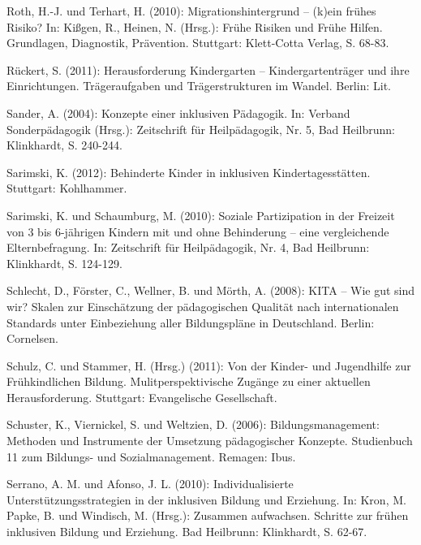 Roth, H.-J. und Terhart, H. (2010): Migrationshintergrund -- (k)ein frühes Risiko? In: Kißgen, R., Heinen, N. (Hrsg.): Frühe Risiken und Frühe Hilfen. Grundlagen, Diagnostik, Prävention. Stuttgart: Klett-Cotta Verlag, S. 68-83.

Rückert, S. (2011): Herausforderung Kindergarten -- Kindergartenträger und ihre Einrichtungen. Trägeraufgaben und Trägerstrukturen im Wandel. Berlin: Lit.
	
Sander, A. (2004): Konzepte einer inklusiven Pädagogik. In: Verband Sonderpädagogik (Hrsg.): Zeitschrift für Heilpädagogik, Nr. 5, Bad Heilbrunn: Klinkhardt, S. 240-244.


Sarimski, K. (2012): Behinderte Kinder in inklusiven Kindertagesstätten. Stuttgart: Kohlhammer. 

Sarimski, K. und Schaumburg, M. (2010): Soziale Partizipation in der Freizeit von 3 bis 6-jährigen Kindern mit und ohne Behinderung -- eine vergleichende Elternbefragung. In: Zeitschrift für Heilpädagogik, Nr. 4, Bad Heilbrunn: Klinkhardt, S. 124-129.


Schlecht, D., Förster, C., Wellner, B. und Mörth, A. (2008): KITA – Wie gut sind wir? Skalen zur Einschätzung der pädagogischen Qualität nach internationalen Standards unter Einbeziehung aller Bildungspläne in Deutschland. Berlin: Cornelsen. 

Schulz, C. und Stammer, H. (Hrsg.) (2011): Von der Kinder- und Jugendhilfe zur Frühkindlichen Bildung. Mulitperspektivische Zugänge zu einer aktuellen Herausforderung. Stuttgart: Evangelische Gesellschaft.

Schuster, K., Viernickel, S. und Weltzien, D. (2006): Bildungsmanagement: Methoden und Instrumente der Umsetzung pädagogischer Konzepte. Studienbuch 11 zum Bildungs- und Sozialmanagement. Remagen: Ibus.

Serrano, A. M. und Afonso, J. L. (2010): Individualisierte Unterstützungsstrategien in der inklusiven Bildung und Erziehung. In: Kron, M. Papke, B. und Windisch, M. (Hrsg.): Zusammen aufwachsen. Schritte zur frühen inklusiven Bildung und Erziehung. Bad Heilbrunn: Klinkhardt, S. 62-67.

